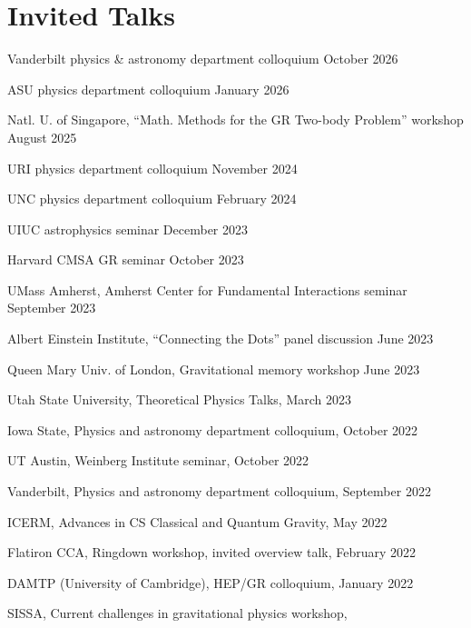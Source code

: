 \newcommand{\playsymbol}{$\blacktriangleright$}
\section{Invited Talks}
\secstartswithlist{}%
\begin{etaremune}
\item
  Vanderbilt physics \& astronomy department colloquium
  \hfill{}
  October 2026
\item
  ASU physics department colloquium
  \hfill{}
  January 2026
\item
  Natl. U. of Singapore, ``Math. Methods for the GR Two-body Problem'' workshop
  \hfill{}
  August 2025
\item
  URI physics department colloquium
  \hfill{}
  November 2024
\item
  UNC physics department colloquium
  \hfill{}
  February 2024
\item
  UIUC astrophysics seminar
  \hfill{}
  December 2023
\item
  Harvard CMSA GR seminar
  \hfill{}
  October 2023
\item
  UMass Amherst, Amherst Center for Fundamental Interactions seminar
  \hfill{}
  September 2023
\item
  Albert Einstein Institute,
  ``Connecting the Dots'' panel discussion
  \hfill{}
  June 2023
\item
  Queen Mary Univ. of London,
  Gravitational memory workshop
  \hfill{}
  June 2023
\item
  Utah State University, Theoretical Physics Talks,
  \hfill{}
  March 2023
\item
  Iowa State, Physics and astronomy department colloquium,
  \hfill{}
  October 2022
\item
  UT Austin, Weinberg Institute seminar,
  \hfill{}
  October 2022
\item
  Vanderbilt, Physics and astronomy department colloquium,
  \hfill{}
  September 2022
\item
  ICERM, Advances in CS Classical and Quantum Gravity,
  \hfill{}
  May 2022
\item
  Flatiron CCA, Ringdown workshop, invited overview talk,
  \hfill{}
  February 2022
\item
  DAMTP (University of Cambridge), HEP/GR colloquium,
  \hfill{}
  January 2022
\item
  SISSA, Current challenges in gravitational physics workshop,
  \hfill{}

\end{etaremune}
